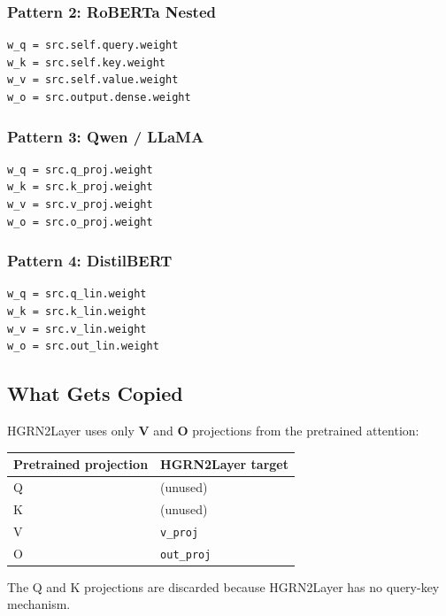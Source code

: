 \subsubsection{Pattern 2: RoBERTa Nested}

\begin{lstlisting}
w_q = src.self.query.weight
w_k = src.self.key.weight
w_v = src.self.value.weight
w_o = src.output.dense.weight
\end{lstlisting}

\subsubsection{Pattern 3: Qwen / LLaMA}

\begin{lstlisting}
w_q = src.q_proj.weight
w_k = src.k_proj.weight
w_v = src.v_proj.weight
w_o = src.o_proj.weight
\end{lstlisting}

\subsubsection{Pattern 4: DistilBERT}

\begin{lstlisting}
w_q = src.q_lin.weight
w_k = src.k_lin.weight
w_v = src.v_lin.weight
w_o = src.out_lin.weight
\end{lstlisting}

\subsection{What Gets Copied}

HGRN2Layer uses only \textbf{V} and \textbf{O} projections from the pretrained attention:

\begin{table}[H]
\centering
\small
\begin{tabular}{ll}
\toprule
\textbf{Pretrained projection} & \textbf{HGRN2Layer target} \\
\midrule
Q & (unused) \\
K & (unused) \\
V & \texttt{v\_proj} \\
O & \texttt{out\_proj} \\
\bottomrule
\end{tabular}
\end{table}

The Q and K projections are discarded because HGRN2Layer has no query-key 
mechanism.

